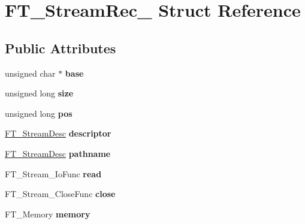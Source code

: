 \hypertarget{struct_f_t___stream_rec__}{
\section{FT\_\-StreamRec\_\- Struct Reference}
\label{struct_f_t___stream_rec__}
}
\subsection*{Public Attributes}
\begin{DoxyCompactItemize}
\item 
\hypertarget{struct_f_t___stream_rec___a7b406cb9a60c5a8b4bd8d04b7a23cfee}{
unsigned char $\ast$ {\bfseries base}}
\label{struct_f_t___stream_rec___a7b406cb9a60c5a8b4bd8d04b7a23cfee}

\item 
\hypertarget{struct_f_t___stream_rec___ab00e3cf802c950d0ca5a022a06953123}{
unsigned long {\bfseries size}}
\label{struct_f_t___stream_rec___ab00e3cf802c950d0ca5a022a06953123}

\item 
\hypertarget{struct_f_t___stream_rec___a5bf82c2ff4554752edfeec442fba2f33}{
unsigned long {\bfseries pos}}
\label{struct_f_t___stream_rec___a5bf82c2ff4554752edfeec442fba2f33}

\item 
\hypertarget{struct_f_t___stream_rec___a361c44020eace21cc453b51852d8cc4f}{
\hyperlink{union_f_t___stream_desc__}{FT\_\-StreamDesc} {\bfseries descriptor}}
\label{struct_f_t___stream_rec___a361c44020eace21cc453b51852d8cc4f}

\item 
\hypertarget{struct_f_t___stream_rec___afd75c5de5ed78c484a200a7e97ef5a41}{
\hyperlink{union_f_t___stream_desc__}{FT\_\-StreamDesc} {\bfseries pathname}}
\label{struct_f_t___stream_rec___afd75c5de5ed78c484a200a7e97ef5a41}

\item 
\hypertarget{struct_f_t___stream_rec___af724049d0258d4988c2b11c3a08b1b05}{
FT\_\-Stream\_\-IoFunc {\bfseries read}}
\label{struct_f_t___stream_rec___af724049d0258d4988c2b11c3a08b1b05}

\item 
\hypertarget{struct_f_t___stream_rec___a7d7c7a1d7de8f580d7ad66efe89defa9}{
FT\_\-Stream\_\-CloseFunc {\bfseries close}}
\label{struct_f_t___stream_rec___a7d7c7a1d7de8f580d7ad66efe89defa9}

\item 
\hypertarget{struct_f_t___stream_rec___a51e2be0d80d70b532aae3face5461e7e}{
FT\_\-Memory {\bfseries memory}}
\label{struct_f_t___stream_rec___a51e2be0d80d70b532aae3face5461e7e}


\end{DoxyCompactItemize}
